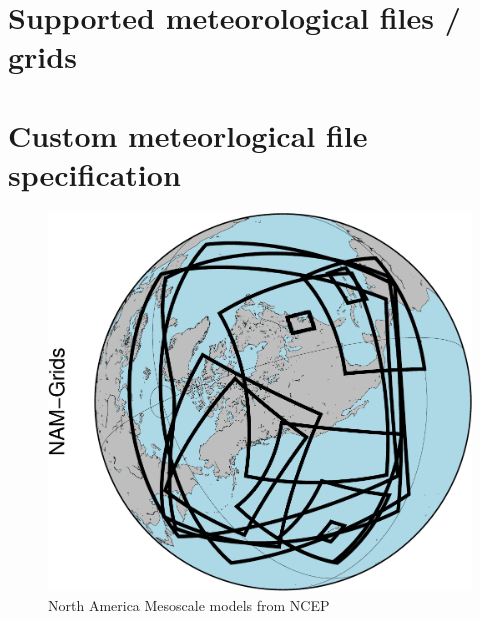 \documentclass[11pt]{article}   %
\begin{document}
%
%
%
%

\clearpage
\section{Supported meteorological files / grids}

\clearpage
\section{Custom meteorlogical file specification}\label{SecCust}
\begin{figure}[htbp]\begin{center}
 \includegraphics[angle=-90,scale=1.0]{Figs/Geostationary_NAM-Grids.pdf}
\parbox{15cm}{\caption{\label{FigNAMs}
North America Mesoscale models from NCEP
}}
\end{center}\end{figure}
\end{document}
